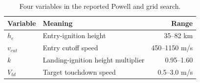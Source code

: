 \begin{table}[htbp]
\caption{Four variables in the reported Powell and grid search.}
\label{tab:src14}
\small
\setlength{\tabcolsep}{3.5pt}
\begin{tabularx}{\linewidth}{@{}lXr@{}}
\toprule
Variable & Meaning & Range \\
\midrule
$h_e$ & Entry-ignition height & 35--82 km \\
$v_{cut}$ & Entry cutoff speed & 450--1150 m/s \\
$k$ & Landing-ignition height multiplier & 0.95--1.60 \\
$V_{td}$ & Target touchdown speed & 0.5--3.0 m/s \\
\bottomrule
\end{tabularx}
\par{}
\end{table}
